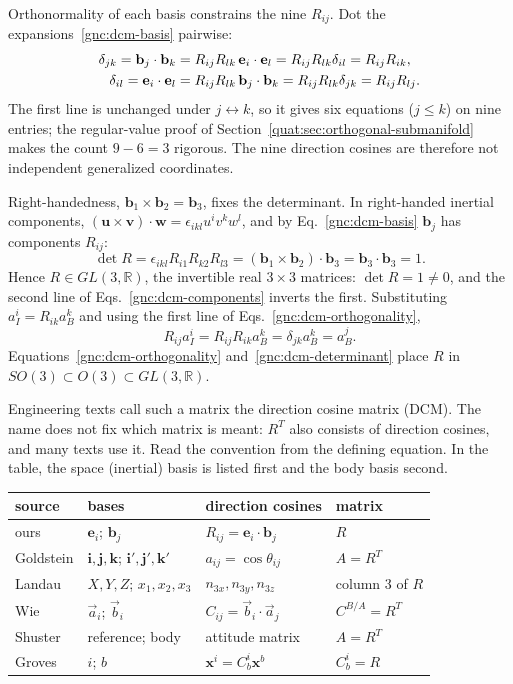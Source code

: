 Orthonormality of each basis constrains the nine $R_{ij}$. Dot the
expansions~\eqref{gnc:dcm-basis} pairwise:
\begin{align}
 \delta_{jk}=\mathbf b_j\cdot\mathbf b_k
 &=R_{ij}R_{lk}\,\mathbf e_i\cdot\mathbf e_l
  =R_{ij}R_{lk}\delta_{il}=R_{ij}R_{ik},\notag\\
 \delta_{il}=\mathbf e_i\cdot\mathbf e_l
 &=R_{ij}R_{lk}\,\mathbf b_j\cdot\mathbf b_k
  =R_{ij}R_{lk}\delta_{jk}=R_{ij}R_{lj}.\label{gnc:dcm-orthogonality}
\end{align}
The first line is unchanged under $j\leftrightarrow k$, so it gives six
equations ($j\le k$) on nine entries; the regular-value proof of
Section~\ref{quat:sec:orthogonal-submanifold} makes the count $9-6=3$
rigorous. The nine direction cosines are therefore not independent
generalized coordinates.

Right-handedness, $\mathbf b_1\times\mathbf b_2=\mathbf b_3$, fixes the
determinant. In right-handed inertial components,
$(\mathbf u\times\mathbf v)\cdot\mathbf w=\epsilon_{ikl}u^iv^kw^l$, and
by Eq.~\eqref{gnc:dcm-basis} $\mathbf b_j$ has components $R_{ij}$:
\begin{equation}\label{gnc:dcm-determinant}
 \det R=\epsilon_{ikl}R_{i1}R_{k2}R_{l3}
 =(\mathbf b_1\times\mathbf b_2)\cdot\mathbf b_3
 =\mathbf b_3\cdot\mathbf b_3=1 .
\end{equation}
Hence $R\in GL(3,\mathbb R)$, the invertible real $3\times3$ matrices:
$\det R=1\ne0$, and the second line of Eqs.~\eqref{gnc:dcm-components}
inverts the first. Substituting $a_I^i=R_{ik}a_B^k$ and using the first
line of Eqs.~\eqref{gnc:dcm-orthogonality},
\[
 R_{ij}a_I^i=R_{ij}R_{ik}a_B^k=\delta_{jk}a_B^k=a_B^j .
\]
Equations~\eqref{gnc:dcm-orthogonality} and~\eqref{gnc:dcm-determinant}
place $R$ in $SO(3)\subset O(3)\subset GL(3,\mathbb R)$.

Engineering texts call such a matrix the direction cosine matrix (DCM).
The name does not fix which matrix is meant: $R^T$ also consists of
direction cosines, and many texts use it. Read the convention from the
defining equation. In the table, the space (inertial) basis is listed
first and the body basis second.
\begin{center}
\small
\begin{tabular}{@{}llll@{}}
 source & bases & direction cosines & matrix\\\hline
 ours & $\mathbf e_i$; $\mathbf b_j$ &
   $R_{ij}=\mathbf e_i\cdot\mathbf b_j$ & $R$\\
 Goldstein \cite{dgdt:GPS2001} & $\mathbf i,\mathbf j,\mathbf k$;
   $\mathbf i',\mathbf j',\mathbf k'$ &
   $a_{ij}=\cos\theta_{ij}$ & $A=R^T$\\
 Landau \cite{LLandauELifshitz1976} & $X,Y,Z$; $x_1,x_2,x_3$ &
   $n_{3x},n_{3y},n_{3z}$ & column 3 of $R$\\
 Wie \cite{BWie2008} & $\vec a_i$; $\vec b_i$ &
   $C_{ij}=\vec b_i\cdot\vec a_j$ & $C^{B/A}=R^T$\\
 Shuster \cite{MDShuster1993} & reference; body &
   attitude matrix & $A=R^T$\\
 Groves \cite{PDGroves2013} & $i$; $b$ &
   $\mathbf x^i=C^i_b\mathbf x^b$ & $C^i_b=R$
\end{tabular}
\end{center}

